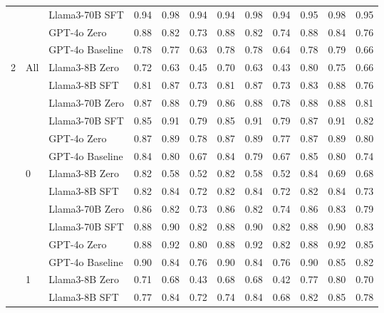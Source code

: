 \begin{longtable}[t]{ll>{}l|rr>{}r|rr>{}r|rrr}
 &  & Llama3-70B SFT & 0.94 & 0.98 & 0.94 & 0.94 & 0.98 & 0.94 & 0.95 & 0.98 & 0.95\\

 &  & GPT-4o Zero & 0.88 & 0.82 & 0.73 & 0.88 & 0.82 & 0.74 & 0.88 & 0.84 & 0.76\\

 &  & GPT-4o Baseline & 0.78 & 0.77 & 0.63 & 0.78 & 0.78 & 0.64 & 0.78 & 0.79 & 0.66\\
\cmidrule{1-12}
2 & All & Llama3-8B Zero & 0.72 & 0.63 & 0.45 & 0.70 & 0.63 & 0.43 & 0.80 & 0.75 & 0.66\\

 &  & Llama3-8B SFT & 0.81 & 0.87 & 0.73 & 0.81 & 0.87 & 0.73 & 0.83 & 0.88 & 0.76\\

 &  & Llama3-70B Zero & 0.87 & 0.88 & 0.79 & 0.86 & 0.88 & 0.78 & 0.88 & 0.88 & 0.81\\

 &  & Llama3-70B SFT & 0.85 & 0.91 & 0.79 & 0.85 & 0.91 & 0.79 & 0.87 & 0.91 & 0.82\\

 &  & GPT-4o Zero & 0.87 & 0.89 & 0.78 & 0.87 & 0.89 & 0.77 & 0.87 & 0.89 & 0.80\\

 &  & GPT-4o Baseline & 0.84 & 0.80 & 0.67 & 0.84 & 0.79 & 0.67 & 0.85 & 0.80 & 0.74\\
\cmidrule{2-12}
 & 0 & Llama3-8B Zero & 0.82 & 0.58 & 0.52 & 0.82 & 0.58 & 0.52 & 0.84 & 0.69 & 0.68\\

 &  & Llama3-8B SFT & 0.82 & 0.84 & 0.72 & 0.82 & 0.84 & 0.72 & 0.82 & 0.84 & 0.73\\

 &  & Llama3-70B Zero & 0.86 & 0.82 & 0.73 & 0.86 & 0.82 & 0.74 & 0.86 & 0.83 & 0.79\\

 &  & Llama3-70B SFT & 0.88 & 0.90 & 0.82 & 0.88 & 0.90 & 0.82 & 0.88 & 0.90 & 0.83\\

 &  & GPT-4o Zero & 0.88 & 0.92 & 0.80 & 0.88 & 0.92 & 0.82 & 0.88 & 0.92 & 0.85\\

 &  & GPT-4o Baseline & 0.90 & 0.84 & 0.76 & 0.90 & 0.84 & 0.76 & 0.90 & 0.85 & 0.82\\
\cmidrule{2-12}
 & 1 & Llama3-8B Zero & 0.71 & 0.68 & 0.43 & 0.68 & 0.68 & 0.42 & 0.77 & 0.80 & 0.70\\

 &  & Llama3-8B SFT & 0.77 & 0.84 & 0.72 & 0.74 & 0.84 & 0.68 & 0.82 & 0.85 & 0.78\\


\end{longtable}
